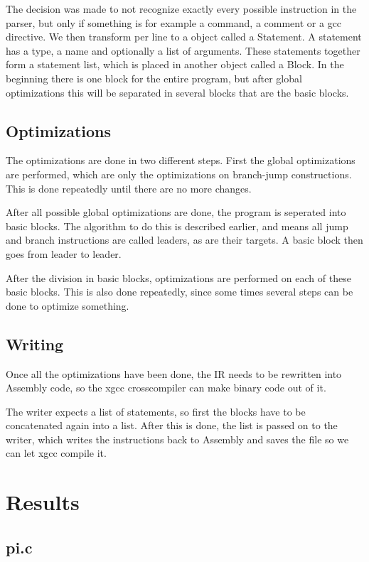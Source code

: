 \documentclass[10pt,a4paper]{article}
\begin{document}
The decision was made to not recognize exactly every possible instruction in
the parser, but only if something is for example a command, a comment or a gcc
directive. We then transform per line to a object called a Statement. A
statement has a type, a name and optionally a list of arguments. These
statements together form a statement list, which is placed in another object
called a Block. In the beginning there is one block for the entire program, but
after global optimizations this will be separated in several blocks that are
the basic blocks.

\subsection{Optimizations}

The optimizations are done in two different steps. First the global
optimizations are performed, which are only the optimizations on branch-jump
constructions. This is done repeatedly until there are no more changes.

After all possible global optimizations are done, the program is seperated into
basic blocks. The algorithm to do this is described earlier, and means all
jump and branch instructions are called leaders, as are their targets. A basic
block then goes from leader to leader.

After the division in basic blocks, optimizations are performed on each of
these basic blocks. This is also done repeatedly, since some times several
steps can be done to optimize something.

\subsection{Writing}

Once all the optimizations have been done, the IR needs to be rewritten into
Assembly code, so the xgcc crosscompiler can make binary code out of it.

The writer expects a list of statements, so first the blocks have to be
concatenated again into a list. After this is done, the list is passed on to
the writer, which writes the instructions back to Assembly and saves the file
so we can let xgcc compile it.

\section{Results}

\subsection{pi.c}
\end{document}
